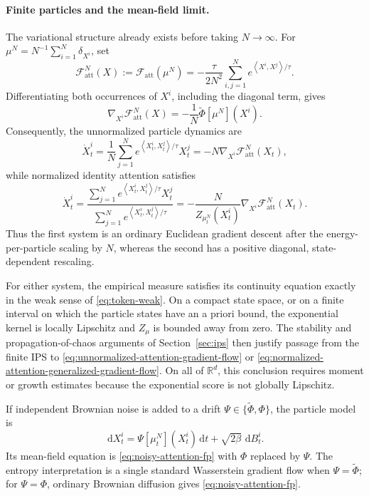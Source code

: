 \documentclass[11pt]{amsart}
\numberwithin{equation}{section}
\theoremstyle{plain}
\newcommand{\R}{\mathbb{R}}
\newcommand{\dd}{\,\mathrm{d}}
\newcommand{\ip}[2]{\left\langle#1,#2\right\rangle}
\begin{document}
\paragraph{\textbf{Finite particles and the mean-field limit.}}
The variational structure already exists before taking $N\to\infty$.  For
$\mu^N=N^{-1}\sum_{i=1}^N\delta_{X^i}$, set
\[
 \mathcal F_{\mathrm{att}}^N(X)
 :=\mathcal F_{\mathrm{att}}(\mu^N)
 =-\frac{\tau}{2N^2}\sum_{i,j=1}^N
 e^{\ip{X^i}{X^j}/\tau}.
\]
Differentiating both occurrences of $X^i$, including the diagonal term,
gives
\[
 \nabla_{X^i}\mathcal F_{\mathrm{att}}^N(X)
 =-\frac1N\widetilde\Phi[\mu^N](X^i).
\]
Consequently, the unnormalized particle dynamics are
\begin{equation}\label{eq:unnormalized-attention-ips}
 \dot X_t^i
 =\frac1N\sum_{j=1}^N
 e^{\ip{X_t^i}{X_t^j}/\tau}X_t^j
 =-N\nabla_{X^i}\mathcal F_{\mathrm{att}}^N(X_t),
\end{equation}
while normalized identity attention satisfies
\begin{equation}\label{eq:normalized-attention-ips}
 \dot X_t^i
 =\frac{\sum_{j=1}^N e^{\ip{X_t^i}{X_t^j}/\tau}X_t^j}
 {\sum_{j=1}^N e^{\ip{X_t^i}{X_t^j}/\tau}}
 =-\frac{N}{Z_{\mu_t^N}(X_t^i)}
 \nabla_{X^i}\mathcal F_{\mathrm{att}}^N(X_t).
\end{equation}
Thus the first system is an ordinary Euclidean gradient descent after the
energy-per-particle scaling by $N$, whereas the second has a positive diagonal, state-dependent rescaling.

For either system, the empirical measure satisfies its continuity equation
exactly in the weak sense of \eqref{eq:token-weak}.  On a compact state space,
or on a finite interval on which the particle states have an a priori bound,
the exponential kernel is locally Lipschitz and $Z_\mu$ is bounded away from
zero.  The stability and propagation-of-chaos arguments of
Section~\ref{sec:ips} then justify passage from the finite IPS to
\eqref{eq:unnormalized-attention-gradient-flow} or
\eqref{eq:normalized-attention-generalized-gradient-flow}.  On all of
$\R^d$, this conclusion requires moment or growth estimates because the
exponential score is not globally Lipschitz.

If independent Brownian noise is added to a drift
$\Psi\in\{\widetilde\Phi,\Phi\}$, the particle model is
\begin{equation}\label{eq:noisy-attention-sde}
 \dd X_t^i=\Psi[\mu_t^N](X_t^i)\dd t+\sqrt{2\beta}\,\dd B_t^i.
\end{equation}
Its mean-field equation is \eqref{eq:noisy-attention-fp} with $\Phi$
replaced by $\Psi$.  The entropy interpretation is a single standard
Wasserstein gradient flow when $\Psi=\widetilde\Phi$; for
$\Psi=\Phi$, ordinary Brownian diffusion gives
\eqref{eq:noisy-attention-fp}.
\end{document}
